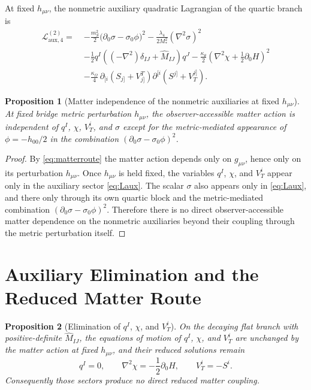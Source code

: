 \documentclass[11pt]{article}
\newtheorem{proposition}{Proposition}
\begin{document}
At fixed \(h_{\mu\nu}\), the nonmetric auxiliary quadratic Lagrangian of the quartic branch is
\begin{align}
\mathcal L_{\mathrm{aux},4}^{(2)}
=\;&
-\frac{m_S^2}{2}\bigl(\partial_0\sigma-\sigma_0\phi\bigr)^2
-\frac{\lambda_4}{2M_*^2}(\nabla^2\sigma)^2
\nonumber\\
&-\frac{1}{2}q^I\!\left((-\nabla^2)\delta_{IJ}+\widehat M_{IJ}\right)\!q^J
-\frac{\kappa_\theta}{2}\left(\nabla^2\chi+\frac{1}{2}\partial_0H\right)^2
\nonumber\\
&-\frac{\kappa_\Omega}{4}\,
\partial_{[i}\!\left(S_{j]}+V^T_{j]}\right)
\partial^{[i}\!\left(S^{j]}+V_T^{j]}\right).
\label{eq:Laux}
\end{align}

\begin{proposition}[Matter independence of the nonmetric auxiliaries at fixed \(h_{\mu\nu}\)]
At fixed bridge metric perturbation \(h_{\mu\nu}\), the observer-accessible matter action is independent of \(q^I\), \(\chi\), \(V_T^i\), and \(\sigma\) except for the metric-mediated appearance of \(\phi=-h_{00}/2\) in the combination \((\partial_0\sigma-\sigma_0\phi)^2\).
\end{proposition}

\begin{proof}
By \eqref{eq:matterroute} the matter action depends only on \(g_{\mu\nu}\), hence only on its perturbation \(h_{\mu\nu}\). Once \(h_{\mu\nu}\) is held fixed, the variables \(q^I\), \(\chi\), and \(V_T^i\) appear only in the auxiliary sector \eqref{eq:Laux}. The scalar \(\sigma\) also appears only in \eqref{eq:Laux}, and there only through its own quartic block and the metric-mediated combination \((\partial_0\sigma-\sigma_0\phi)^2\). Therefore there is no direct observer-accessible matter dependence on the nonmetric auxiliaries beyond their coupling through the metric perturbation itself.
\end{proof}

\section{Auxiliary Elimination and the Reduced Matter Route}

\begin{proposition}[Elimination of \(q^I\), \(\chi\), and \(V_T^i\)]
On the decaying flat branch with positive-definite \(\widehat M_{IJ}\), the equations of motion of \(q^I\), \(\chi\), and \(V_T^i\) are unchanged by the matter action at fixed \(h_{\mu\nu}\), and their reduced solutions remain
\begin{equation}
q^I=0,
\qquad
\nabla^2\chi=-\frac{1}{2}\partial_0H,
\qquad
V_T^i=-S^i.
\label{eq:auxsolves}
\end{equation}
Consequently those sectors produce no direct reduced matter coupling.
\end{proposition}
\end{document}
